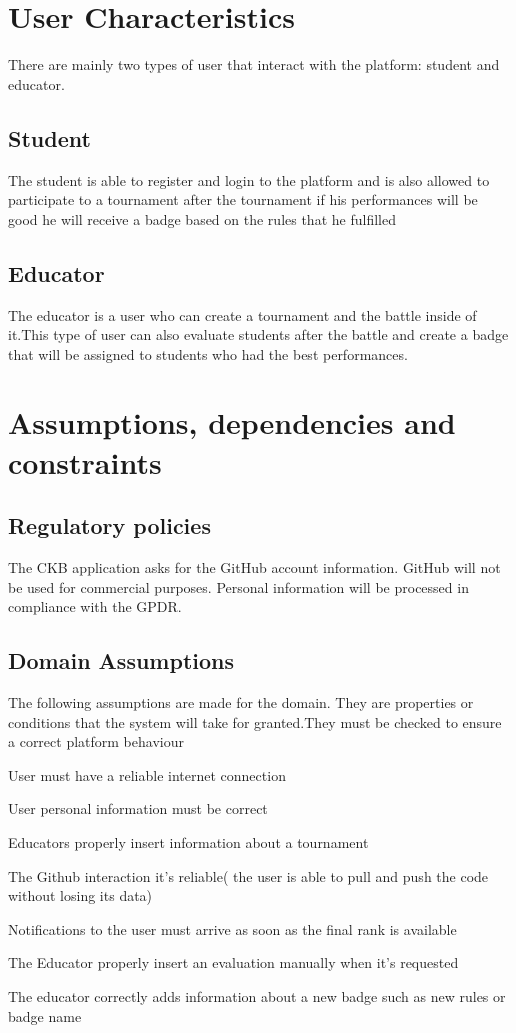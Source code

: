 \section{User Characteristics}
There are mainly two types of user that interact with the platform: student and educator.

\subsection{Student}
The student  is able to register and login to the platform and is also allowed to participate to a tournament after the tournament if his performances will be good he will receive a badge based on the rules that he fulfilled

\subsection{Educator}
The educator is a user who can create a tournament and the battle inside of it.This type of user can also evaluate students after the battle and create a badge that will be assigned to students who had the best performances.



\pagebreak
\section{Assumptions, dependencies and constraints}

\subsection{Regulatory policies}
The CKB application asks for the GitHub account information. GitHub will not be used for commercial purposes. Personal information will be processed in compliance with the GPDR.

\subsection{Domain Assumptions}
The following assumptions are made for the domain. They are properties or conditions that the system will take for granted.They must be checked to ensure a correct platform behaviour
\begin{enumerate}[label={[D\arabic*]}]

    \item User must have a reliable internet connection
    \item User personal information must be correct
    \item Educators properly insert information about a tournament
    \item The Github interaction it's reliable( the user is able to pull and push the code without losing its data)
    \item Notifications to the user must arrive as soon as the final rank is available
    \item The Educator properly insert an evaluation manually when it's requested
    \item The educator correctly adds information about a new badge such as new rules or badge name
    
\end{enumerate}